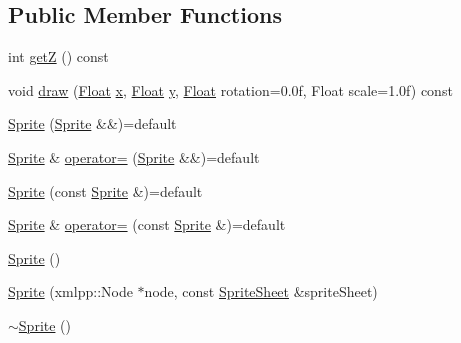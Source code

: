 \subsection*{Public Member Functions}
\begin{DoxyCompactItemize}
\item 
int \hyperlink{classZeta_1_1Cell_1_1Sprite_a32816204c36139db9c6419dfb941b9d2}{get\+Z} () const 
\item 
void \hyperlink{classZeta_1_1Cell_1_1Sprite_a05a31c5ef9a91d6e92ecc77df3bbf010}{draw} (\hyperlink{namespaceZeta_a1e0a1265f9b3bd3075fb0fabd39088ba}{Float} \hyperlink{classZeta_1_1Cell_1_1Sprite_aed4855117315ce32960e1c4282e580e2}{x}, \hyperlink{namespaceZeta_a1e0a1265f9b3bd3075fb0fabd39088ba}{Float} \hyperlink{classZeta_1_1Cell_1_1Sprite_afccf05d1dfa7d34ee26386c2435d1013}{y}, \hyperlink{namespaceZeta_a1e0a1265f9b3bd3075fb0fabd39088ba}{Float} rotation=0.\+0f, Float scale=1.\+0f) const 
\item 
\hyperlink{classZeta_1_1Cell_1_1Sprite_a7ef6f37254859c0c984b43a39bfd215d}{Sprite} (\hyperlink{classZeta_1_1Cell_1_1Sprite}{Sprite} \&\&)=default
\item 
\hyperlink{classZeta_1_1Cell_1_1Sprite}{Sprite} \& \hyperlink{classZeta_1_1Cell_1_1Sprite_a631fbdb695857a670a0af11c12f43a3f}{operator=} (\hyperlink{classZeta_1_1Cell_1_1Sprite}{Sprite} \&\&)=default
\item 
\hyperlink{classZeta_1_1Cell_1_1Sprite_a6c39a1b9f6686d33d892612baab2e72f}{Sprite} (const \hyperlink{classZeta_1_1Cell_1_1Sprite}{Sprite} \&)=default
\item 
\hyperlink{classZeta_1_1Cell_1_1Sprite}{Sprite} \& \hyperlink{classZeta_1_1Cell_1_1Sprite_a261cfe9a1399e0020b86802e69c965a2}{operator=} (const \hyperlink{classZeta_1_1Cell_1_1Sprite}{Sprite} \&)=default
\item 
\hyperlink{classZeta_1_1Cell_1_1Sprite_ac6431539df4ecfae0656e8acbf26ad71}{Sprite} ()
\item 
\hyperlink{classZeta_1_1Cell_1_1Sprite_aa87752188c3d01043fc82dd9627076d5}{Sprite} (xmlpp\+::\+Node $\ast$node, const \hyperlink{classZeta_1_1SpriteSheet}{Sprite\+Sheet} \&sprite\+Sheet)
\item 
\hyperlink{classZeta_1_1Cell_1_1Sprite_aa4658c60df41cc00471d2d96959bab3c}{$\sim$\+Sprite} ()
\end{DoxyCompactItemize}
